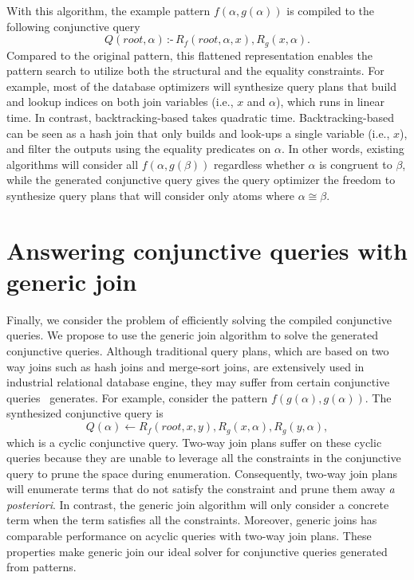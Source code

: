 With this algorithm, the example pattern $f(\alpha, g(\alpha))$
 is compiled to the following conjunctive query $$Q(\textit{root},\alpha)\,\textit{:-}\,R_f(\textit{root},\alpha,x),R_g(x,\alpha).$$
Compared to the original \ematching pattern, this flattened representation enables the pattern search to utilize both the structural and the equality constraints. For example, most of the database optimizers will synthesize query plans that build and lookup indices on both join variables (i.e., $x$ and $\alpha$), which runs in linear time. In contrast,  backtracking-based \ematching takes quadratic time. Backtracking-based \ematching can be seen as a hash join that only builds and look-ups a single variable (i.e., $x$), and filter the outputs using the equality predicates on $\alpha$. In other words, existing \ematching algorithms will consider all $f(\alpha, g(\beta))$ regardless whether $\alpha$ is congruent to $\beta$, while the generated conjunctive query gives the query optimizer the freedom to synthesize query plans that will consider only atoms where $\alpha\cong\beta$.

\section{Answering conjunctive queries with generic join}


Finally, we consider the problem of efficiently solving the compiled conjunctive
queries. We propose to use the generic join algorithm to solve the generated
conjunctive queries. Although traditional query plans, which are based on two
way joins such as hash joins and merge-sort joins, are
extensively used in industrial relational database engine, they may suffer from
certain conjunctive queries \ematching~generates. For example, consider the
pattern $f(g(\alpha),g(\alpha))$. The synthesized conjunctive query
is $$Q(\alpha)\gets R_f(\textit{root}, x, y), R_g(x, \alpha), R_g(y, \alpha),$$
which is a cyclic conjunctive query. Two-way join plans suffer on these cyclic
queries because they are unable to leverage all the constraints in the
conjunctive query to prune the space during enumeration. Consequently, two-way
join plans will enumerate terms that do not satisfy the constraint and prune
them away \textit{a posteriori}. In contrast, the generic join algorithm will
only consider a concrete term when the term satisfies all the constraints.
Moreover, generic joins has comparable
performance on acyclic queries with two-way join plans. These properties make
generic join our ideal solver for conjunctive queries generated from \ematching
patterns.